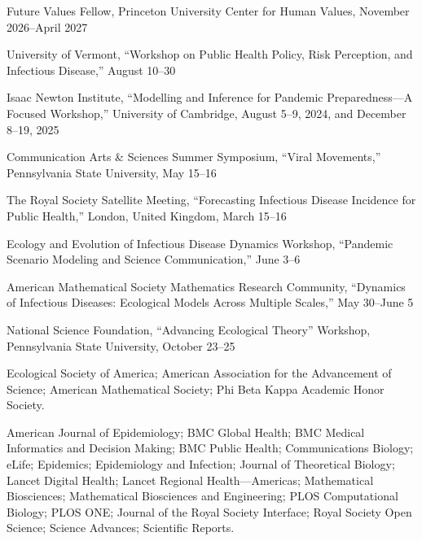 


%


\begin{cvnumbered}
\item Future Values Fellow, Princeton University Center for Human Values, November 2026--April 2027
\item University of Vermont, ``Workshop on Public Health Policy, Risk Perception, and Infectious Disease,'' August 10--30
\item Isaac Newton Institute, ``Modelling and Inference for Pandemic Preparedness---A Focused Workshop,'' University of Cambridge, August 5--9, 2024, and December 8--19, 2025
\item Communication Arts \& Sciences Summer Symposium, ``Viral Movements,'' Pennsylvania State University, May 15--16
\item The Royal Society Satellite Meeting, ``Forecasting Infectious Disease Incidence for Public Health,'' London, United Kingdom, March 15--16
\item Ecology and Evolution of Infectious Disease Dynamics Workshop, ``Pandemic Scenario Modeling and Science Communication,'' June 3--6
\item American Mathematical Society Mathematics Research Community, ``Dynamics of Infectious Diseases: Ecological Models Across Multiple Scales,'' May 30--June 5
\item National Science Foundation, ``Advancing Ecological Theory'' Workshop, Pennsylvania State University, October 23--25
\end{cvnumbered}


Ecological Society of America; American Association for the Advancement of Science; American Mathematical Society; Phi Beta Kappa Academic Honor Society.


American Journal of Epidemiology; BMC Global Health; BMC Medical Informatics and Decision Making; BMC Public Health; Communications Biology; eLife; Epidemics; Epidemiology and Infection; Journal of Theoretical Biology; Lancet Digital Health; Lancet Regional Health---Americas; Mathematical Biosciences; Mathematical Biosciences and Engineering; PLOS Computational Biology; PLOS ONE; Journal of the Royal Society Interface; Royal Society Open Science; Science Advances; Scientific Reports.
